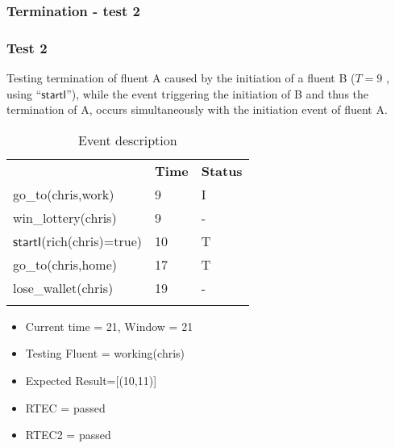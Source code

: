 \documentclass[8pt]{beamer}
\def \patsize {}
\def\startI{\textsf{\patsize startI}}
\begin{document}
\begin{frame}
    \frametitle{Termination - test 2}
    \subsubsection{Test 2}
    \small
    Testing termination of fluent A caused by the initiation of a fluent B ($T=9$ , using ``$\startI$''), while the event triggering the initiation of B and thus the termination of A, occurs simultaneously with the initiation event of fluent A.\linebreak
    \begin{minipage}{0.48\linewidth}
        \begin{table}[t!]
            \caption{Event description}
            \begin{center}

                \begin{tabular}{lll}
                    \hline\noalign{\smallskip}
                    \multicolumn{1}{l}{\textbf{Event}} & \multicolumn{1}{c}{\textbf{Time}} & \multicolumn{1}{c}{\textbf{Status}} \\
                    go\_to(chris,work)&9&I\\
                    win\_lottery(chris)&9&-\\
                    $\startI$(rich(chris)=true)&10& T\\
                    go\_to(chris,home)&17&T\\
                    lose\_wallet(chris)&19&-\\
                    \noalign{\smallskip}
                    \hline
                \end{tabular}
            \end{center}
        \end{table}
        \begin{itemize}
            \item Current time = 21, Window = 21
            \item Testing Fluent = working(chris)
            \item Expected Result=[(10,11)]
            \item RTEC = passed
            \item RTEC2 = passed
        \end{itemize}
    \end{minipage}
    \begin{minipage}{0.48\linewidth}


\end{minipage}
\end{frame}
\end{document}
